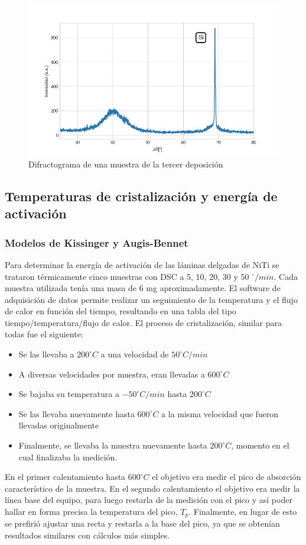 \documentclass{article}
\theoremstyle{definition}
\theoremstyle{remark}
\begin{document}
\begin{figure}[H]
 	\centering
	\includegraphics[scale=0.6]{img/RX_amorfo.png}
 	\caption{Difractograma de una muestra de la tercer deposición}
	\label{amorfo}
\end{figure}

\subsection{Temperaturas de cristalización y energía de activación}
\subsubsection{Modelos de Kissinger y Augis-Bennet}
Para determinar la energía de activación de las láminas delgadas de NiTi se trataron térmicamente cinco muestras con DSC a 5, 10, 20, 30 y 50 $^{\circ}/min$. Cada muestra utilizada tenía una masa de 6 mg aproximadamente. El software de adquisición de datos permite realizar un seguimiento de la temperatura y el flujo de calor en función del tiempo, resultando en una tabla del tipo tiempo/temperatura/flujo de calor. El proceso de cristalización, similar para todas fue el siguiente:

\begin{itemize}
\item Se las llevaba a $200^{\circ}C$ a una velocidad de $50^{\circ}C/min$
\item A diversas velocidades por muestra, eran llevadas a $600^{\circ}C$
\item Se bajaba su temperatura a $-50^{\circ}C/min$ hasta $200^{\circ}C$
\item Se las llevaba nuevamente hasta $600^{\circ}C$ a la misma velocidad que fueron llevadas originalmente
\item Finalmente, se llevaba la muestra nuevamente hasta $200^{\circ}C$, momento en el cual finalizaba la medición.
\end{itemize}
En el primer calentamiento hasta $600^{\circ}C$ el objetivo era medir el pico de absorción característico de la muestra. En el segundo calentamiento el objetivo era medir la línea base del equipo, para luego restarla de la medición con el pico y así poder hallar en forma precisa la temperatura del pico, $T_p$. Finalmente, en lugar de esto se prefirió ajustar una recta y restarla a la base del pico, ya que se obtenían resultados similares con cálculos más simples.
\end{document}
